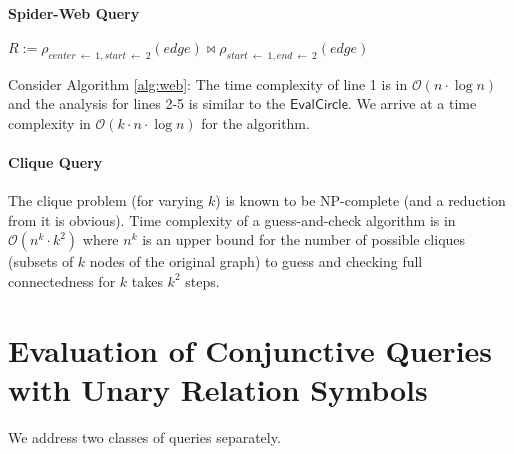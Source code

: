 \documentclass[a4paper,12pt]{article}
\newcommand{\bigo}{\ensuremath{\mathcal{O}}}
\begin{document}
\paragraph{Spider-Web Query}{
\begin{algorithm}
	$R := \rho_{center \: \leftarrow\: 1, start\: \leftarrow\: 2}(edge) \bowtie \rho_{start\: \leftarrow\: 1, end\: \leftarrow\: 2}(edge)$\\
	\caption{$\mathsf{EvalSpiderWeb}(k)$}
	\label{alg:web}
\end{algorithm}

Consider Algorithm \ref{alg:web}: The time complexity of line 1 is in $\bigo(n \cdot \log n)$ and the analysis for lines 2-5 is similar to the $\mathsf{EvalCircle}$. We arrive at a time complexity in $\bigo(k \cdot n \cdot \log n)$ for the algorithm.
}

\paragraph{Clique Query}{The clique problem (for varying $k$) is known to be NP-complete (and a reduction from it is obvious). Time complexity of a guess-and-check algorithm is in $\bigo(n^k \cdot k^2)$ where $n^k$ is an upper bound for the number of possible cliques (subsets of $k$ nodes of the original graph) to guess and checking full connectedness for $k$ takes $k^2$ steps.}

\section{Evaluation of Conjunctive Queries with Unary Relation Symbols}

We address two classes of queries separately.
\end{document}
